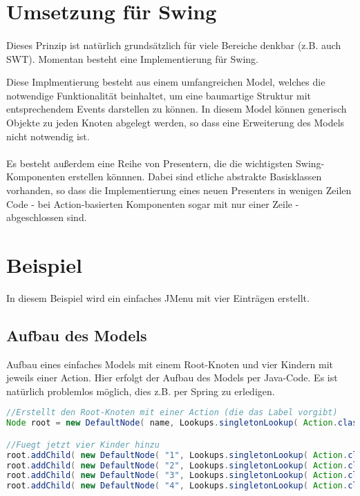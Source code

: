 \documentclass[oneside,a4paper]{scrartcl}
\begin{document}
\section{Umsetzung für Swing}
\paragraph{}
Dieses Prinzip ist natürlich grundsätzlich für viele Bereiche denkbar (z.B. auch SWT). Momentan besteht eine
Implementierung für Swing.

Diese Implmentierung besteht aus einem umfangreichen Model, welches die notwendige Funktionalität beinhaltet,
um eine baumartige Struktur mit entsprechendem Events darstellen zu können. In diesem Model können generisch
Objekte zu jeden Knoten abgelegt werden, so dass eine Erweiterung des Models nicht notwendig ist.

\paragraph{}
Es besteht außerdem eine Reihe von Presentern, die die wichtigsten Swing-Komponenten erstellen könnnen. Dabei
sind etliche abstrakte Basisklassen vorhanden, so dass die Implementierung eines neuen Presenters in wenigen
Zeilen Code - bei Action-basierten Komponenten sogar mit nur einer Zeile - abgeschlossen sind.


\section{Beispiel}
In diesem Beispiel wird ein einfaches JMenu mit vier Einträgen erstellt.

\subsection{Aufbau des Models}
Aufbau eines einfaches Models mit einem Root-Knoten und vier Kindern mit jeweils einer Action. Hier erfolgt der
Aufbau des Models per Java-Code. Es ist natürlich problemlos möglich, dies z.B. per Spring zu erledigen.

\begin{lstlisting}[language=Java,breaklines=true]
//Erstellt den Root-Knoten mit einer Action (die das Label vorgibt)
Node root = new DefaultNode( name, Lookups.singletonLookup( Action.class, menuAction ) );

//Fuegt jetzt vier Kinder hinzu
root.addChild( new DefaultNode( "1", Lookups.singletonLookup( Action.class, action0 ) ) );
root.addChild( new DefaultNode( "2", Lookups.singletonLookup( Action.class, action1 ) ) );
root.addChild( new DefaultNode( "3", Lookups.singletonLookup( Action.class, action2 ) ) );
root.addChild( new DefaultNode( "4", Lookups.singletonLookup( Action.class, action3 ) ) );
\end{lstlisting}
\end{document}

